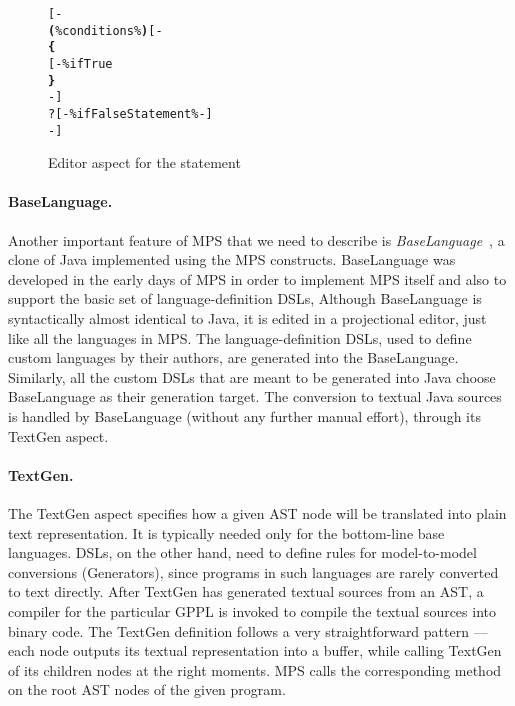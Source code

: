 \begin{figure}[ht]
\vspace{-1mm}
\centering
\begin{alltt}
\small
{}  
    [-
       \textbf{(} \% conditions \% \textbf{)} [-
      \textbf{\{}
      [- \% ifTrue % -]
      \textbf{\}}
    -]
    ?[-  \% ifFalseStatement \% -]
    -]
\end{alltt}
\vspace{-1mm}
\caption{Editor aspect for the  statement}
\label{fig:if_editor_definition}
\vspace{-2mm}
\end{figure}

\paragraph{BaseLanguage.}
Another important feature of MPS that we need to describe is \emph{BaseLanguage}~\cite{ref:BASELANG}, a clone of Java implemented using the MPS constructs.
BaseLanguage was developed in the early days of MPS in order to implement MPS itself and also to support the basic set of language-definition DSLs,
Although BaseLanguage is syntactically almost identical to Java, it is edited in a projectional editor, just like all the languages in MPS.
The language-definition DSLs, used to define custom languages by their authors, are generated into the BaseLanguage.
Similarly, all the custom DSLs that are meant to be generated into Java choose BaseLanguage as their generation target.
The conversion to textual Java sources is handled by BaseLanguage (without any further manual effort), through its TextGen aspect.

\paragraph{TextGen.}
The TextGen aspect specifies how a given AST node will be translated into plain text representation.
It is typically needed only for the bottom-line base languages.
DSLs, on the other hand, need to define rules for model-to-model conversions (Generators), since programs in such languages are rarely converted to text directly.
After TextGen has generated textual sources from an AST, a compiler for the particular GPPL is invoked to compile the textual sources into binary code.
The TextGen definition follows a very straightforward pattern --- each node outputs its textual representation into a buffer, while calling TextGen of its children nodes at the right moments.
MPS calls the corresponding method on the root AST nodes of the given program.

